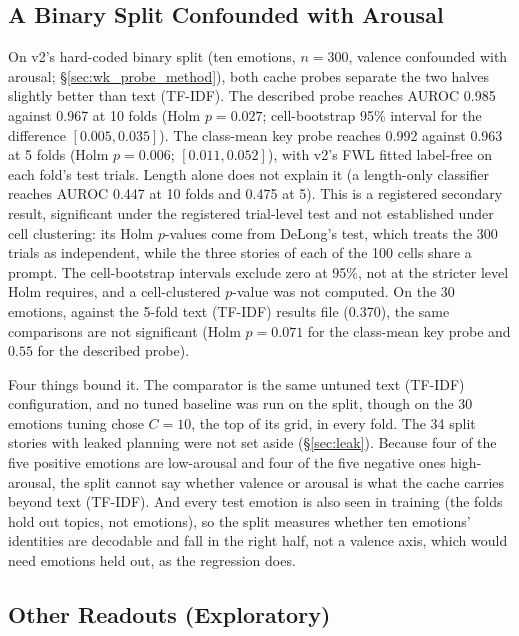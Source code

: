 \documentclass[11pt,a4paper]{article}
\begin{document}
\subsection{A Binary Split Confounded with Arousal}
\label{sec:valence_split}

On v2's hard-coded binary split (ten emotions, $n = 300$, valence confounded with arousal; \S\ref{sec:wk_probe_method}), both cache probes separate the two halves slightly better than text (TF-IDF). The described probe reaches AUROC 0.985 against 0.967 at 10 folds (Holm $p = 0.027$; cell-bootstrap 95\% interval for the difference $[0.005, 0.035]$). The class-mean key probe reaches 0.992 against 0.963 at 5 folds (Holm $p = 0.006$; $[0.011, 0.052]$), with v2's FWL fitted label-free on each fold's test trials. Length alone does not explain it (a length-only classifier reaches AUROC 0.447 at 10 folds and 0.475 at 5). This is a registered secondary result, significant under the registered trial-level test and not established under cell clustering: its Holm $p$-values come from DeLong's test, which treats the 300 trials as independent, while the three stories of each of the 100 cells share a prompt. The cell-bootstrap intervals exclude zero at 95\%, not at the stricter level Holm requires, and a cell-clustered $p$-value was not computed. On the 30 emotions, against the 5-fold text (TF-IDF) results file (0.370), the same comparisons are not significant (Holm $p = 0.071$ for the class-mean key probe and $0.55$ for the described probe).

Four things bound it. The comparator is the same untuned text (TF-IDF) configuration, and no tuned baseline was run on the split, though on the 30 emotions tuning chose $C = 10$, the top of its grid, in every fold. The 34 split stories with leaked planning were not set aside (\S\ref{sec:leak}). Because four of the five positive emotions are low-arousal and four of the five negative ones high-arousal, the split cannot say whether valence or arousal is what the cache carries beyond text (TF-IDF). And every test emotion is also seen in training (the folds hold out topics, not emotions), so the split measures whether ten emotions' identities are decodable and fall in the right half, not a valence axis, which would need emotions held out, as the regression does.

\subsection{Other Readouts (Exploratory)}
\label{sec:where}
\end{document}
